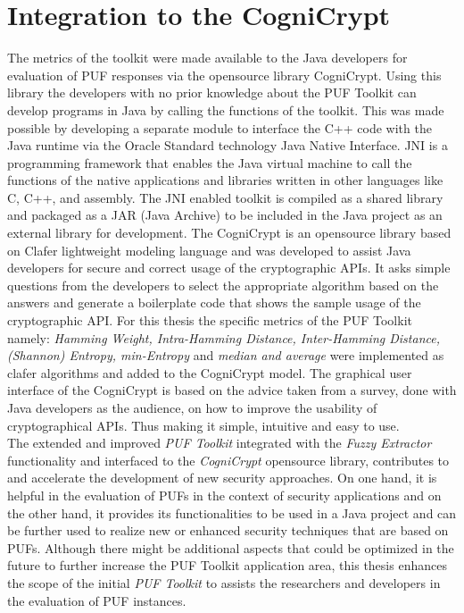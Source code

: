 \section{Integration to the CogniCrypt}
The metrics of the toolkit were made available to the Java developers for evaluation of PUF responses via the opensource library CogniCrypt. Using this library the developers with no prior knowledge about the PUF Toolkit can develop programs in Java by calling the functions of the toolkit. This was made possible by developing a separate module to interface the C++ code with the Java runtime via the Oracle Standard technology Java Native Interface. JNI is a programming
framework that enables the Java virtual machine to call the functions of the native applications and libraries written in other languages like C, C++, and assembly. The JNI enabled toolkit is compiled as a shared library and packaged as a JAR (Java Archive) to be included in the Java project as an external library for development. The CogniCrypt is an opensource library \cite{cogni} based on Clafer lightweight modeling language \cite{clafer} and was developed to assist Java developers for secure and correct usage of the cryptographic APIs. It asks
simple questions from the developers to select the appropriate algorithm based on the answers and generate a boilerplate code that shows the sample usage of the cryptographic API. For this thesis the specific metrics of the PUF Toolkit namely: \emph{Hamming Weight, Intra-Hamming Distance, Inter-Hamming Distance, (Shannon) Entropy, min-Entropy} and \emph{median and average} were implemented as clafer algorithms and added to the CogniCrypt model. The graphical user interface of the
CogniCrypt is based on the advice taken from a survey, done with Java developers as the audience, on how to improve the usability of cryptographical APIs. Thus making it simple, intuitive and easy to use.\\

The extended and improved \emph{PUF Toolkit} integrated with the \emph{Fuzzy Extractor} functionality and interfaced to the \emph{CogniCrypt} opensource library, contributes to and accelerate the development of new security approaches. On one hand, it is helpful in the evaluation of PUFs in the context of security applications and on the other hand, it provides its functionalities to be used in a Java project and can be further used to realize new or enhanced security techniques that
are based on PUFs. Although there might be additional aspects that could be optimized in the future to further increase the PUF Toolkit application area, this thesis enhances the scope of the initial \emph{PUF Toolkit} to assists the researchers and developers in the evaluation of PUF instances.


